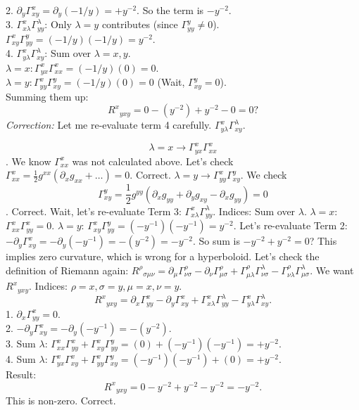 \documentclass[11pt, a4paper]{report}
\begin{document}
2. $\partial_y \Gamma^x_{xy} = \partial_y (-1/y) = +y^{-2}$. So the term is $-y^{-2}$.\\

3. $\Gamma^x_{x\lambda} \Gamma^\lambda_{yy}$: Only $\lambda=y$ contributes (since $\Gamma^y_{yy} \neq 0$).\\

   $\Gamma^x_{xy} \Gamma^y_{yy} = (-1/y)(-1/y) = y^{-2}$.\\

4. $\Gamma^x_{y\lambda} \Gamma^\lambda_{xy}$: Sum over $\lambda=x, y$.\\

   $\lambda=x: \Gamma^x_{yx} \Gamma^x_{xx} = (-1/y)(0) = 0$.\\

   $\lambda=y: \Gamma^x_{yy} \Gamma^y_{xy} = (-1/y)(0) = 0$ (Wait, $\Gamma^y_{xy}=0$).\\

Summing them up:
\begin{equation}
{R^x}_{yxy} = 0 - (y^{-2}) + y^{-2} - 0 = 0?
\end{equation}
\textit{Correction:} Let me re-evaluate term 4 carefully. $\Gamma^x_{y\lambda} \Gamma^\lambda_{xy}$.

$$\lambda=x \to \Gamma^x_{yx} \Gamma^x_{xx}$$. We know $\Gamma^x_{xx}$ was not calculated above. Let's check $\Gamma^x_{xx} = \frac{1}{2}g^{xx}(\partial_x g_{xx} + \dots) = 0$. Correct.
$\lambda=y \to \Gamma^x_{yy} \Gamma^y_{xy}$. We check $$\Gamma^y_{xy} = \frac{1}{2}g^{yy}(\partial_x g_{yy} + \partial_y g_{xy} - \partial_x g_{yy}) = 0$$. Correct.
Wait, let's re-evaluate Term 3: $\Gamma^x_{x\lambda} \Gamma^\lambda_{yy}$.
Indices: Sum over $\lambda$.
$\lambda=x$: $\Gamma^x_{xx} \Gamma^x_{yy} = 0$.
$\lambda=y$: $\Gamma^x_{xy} \Gamma^y_{yy} = (-y^{-1})(-y^{-1}) = y^{-2}$.
Let's re-evaluate Term 2: $-\partial_y \Gamma^x_{xy} = -\partial_y (-y^{-1}) = -(y^{-2}) = -y^{-2}$.
So sum is $-y^{-2} + y^{-2} = 0$? This implies zero curvature, which is wrong for a hyperboloid.
Let's check the definition of Riemann again:
${R^\rho}_{\sigma\mu\nu} = \partial_\mu \Gamma^\rho_{\nu\sigma} - \partial_\nu \Gamma^\rho_{\mu\sigma} + \Gamma^\rho_{\mu\lambda} \Gamma^\lambda_{\nu\sigma} - \Gamma^\rho_{\nu\lambda} \Gamma^\lambda_{\mu\sigma}$.
We want ${R^x}_{yxy}$. Indices: $\rho=x, \sigma=y, \mu=x, \nu=y$.
\begin{equation}
{R^x}_{yxy} = \partial_x \Gamma^x_{yy} - \partial_y \Gamma^x_{xy} + \Gamma^x_{x\lambda} \Gamma^\lambda_{yy} - \Gamma^x_{y\lambda} \Gamma^\lambda_{xy}.
\end{equation}
1. $\partial_x \Gamma^x_{yy} = 0$.\\
2. $-\partial_y \Gamma^x_{xy} = -\partial_y (-y^{-1}) = -(y^{-2})$.\\
3. Sum $\lambda$: $\Gamma^x_{xx}\Gamma^x_{yy} + \Gamma^x_{xy}\Gamma^y_{yy} = (0) + (-y^{-1})(-y^{-1}) = +y^{-2}$.\\
4. Sum $\lambda$: $\Gamma^x_{yx}\Gamma^x_{xy} + \Gamma^x_{yy}\Gamma^y_{xy} = (-y^{-1})(-y^{-1}) + (0) = +y^{-2}$.\\
Result:
\begin{equation}
{R^x}_{yxy} = 0 - y^{-2} + y^{-2} - y^{-2} = -y^{-2}.
\end{equation}
This is non-zero. Correct.
\end{document}
